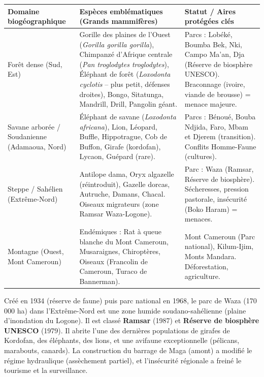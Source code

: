 \documentclass[11pt]{article}
\begin{document}
\begin{center}
\begin{tabularx}{\linewidth}{|l|X|X|}\hline
\textbf{Domaine biogéographique} & \textbf{Espèces emblématiques (Grands mammifères)} & \textbf{Statut / Aires protégées clés} \\ \hline
Forêt dense (Sud, Est) & Gorille des plaines de l'Ouest (\emph{Gorilla gorilla gorilla}), Chimpanzé d'Afrique centrale (\emph{Pan troglodytes troglodytes}), Éléphant de forêt (\emph{Loxodonta cyclotis} -- plus petit, défenses droites), Bongo, Sitatunga, Mandrill, Drill, Pangolin géant. & Parcs : Lobéké, Boumba Bek, Nki, Campo Ma'an, Dja (Réserve de biosphère UNESCO). Braconnage (ivoire, viande de brousse) = menace majeure. \\ \hline
Savane arborée / Soudanienne (Adamaoua, Nord) & Éléphant de savane (\emph{Loxodonta africana}), Lion, Léopard, Buffle, Hippotrague, Cob de Buffon, Girafe (kordofan), Lycaon, Guépard (rare). & Parcs : Bénoué, Bouba Ndjida, Faro, Mbam et Djerem (transition). Conflits Homme-Faune (cultures). \\ \hline
Steppe / Sahélien (Extrême-Nord) & Antilope dama, Oryx algazelle (réintroduit), Gazelle dorcas, Autruche, Damans, Chacal. Oiseaux migrateurs (zone Ramsar Waza-Logone). & Parc : Waza (Ramsar, Réserve de biosphère). Sécheresses, pression pastorale, insécurité (Boko Haram) = menaces. \\ \hline
Montagne (Ouest, Mont Cameroun) & Endémiques : Rat à queue blanche du Mont Cameroun, Musaraignes, Chiroptères, Oiseaux (Francolin de Cameroun, Turaco de Bannerman). & Mont Cameroun (Parc national), Kilum-Ijim, Monts Mandara. Déforestation, agriculture. \\ \hline
\end{tabularx}
\end{center}

\begin{savaistu}
Créé en 1934 (réserve de faune) puis parc national en 1968, le parc de Waza (170 000 ha) dans l'Extrême-Nord est une zone humide soudano-sahélienne (plaine d'inondation du Logone). Il est classé \textbf{Ramsar} (1987) et \textbf{Réserve de biosphère UNESCO} (1979). Il abrite l'une des dernières populations de girafes de Kordofan, des éléphants, des lions, et une avifaune exceptionnelle (pélicans, marabouts, canards). La construction du barrage de Maga (amont) a modifié le régime hydraulique (assèchement partiel), et l'insécurité régionale a freiné le tourisme et la surveillance.
\end{savaistu}
\end{document}
